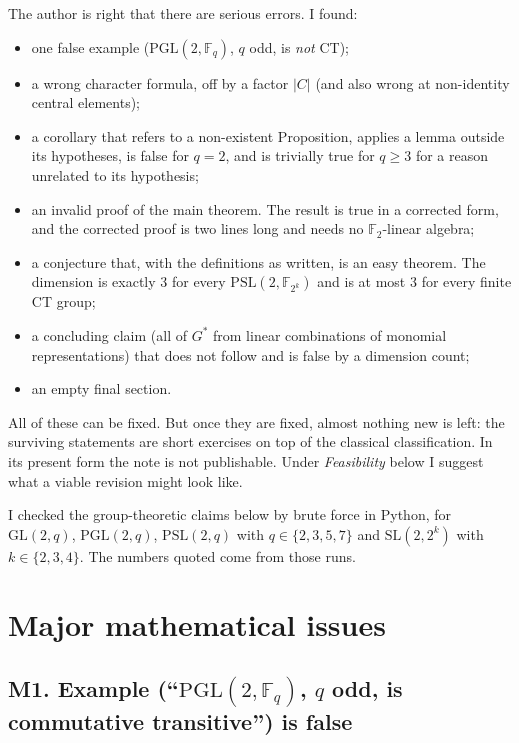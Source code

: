 \documentclass[12pt,letterpaper]{article}
\newcommand{\F}{\mathbb{F}}
\newcommand{\PGL}{\mathrm{PGL}}
\newcommand{\PSL}{\mathrm{PSL}}
\newcommand{\GL}{\mathrm{GL}}
\newcommand{\SL}{\mathrm{SL}}
\theoremstyle{definition}
\begin{document}
The author is right that there are serious errors. I found:
\begin{itemize}[leftmargin=*,itemsep=1pt]
\item one false example ($\PGL(2,\F_q)$, $q$ odd, is \emph{not} CT);
\item a wrong character formula, off by a factor $|C|$ (and also wrong at
  non-identity central elements);
\item a corollary that refers to a non-existent Proposition, applies a
  lemma outside its hypotheses, is false for $q=2$, and is trivially true
  for $q\ge3$ for a reason unrelated to its hypothesis;
\item an invalid proof of the main theorem. The result is true in a
  corrected form, and the corrected proof is two lines long and needs no
  $\F_2$-linear algebra;
\item a conjecture that, with the definitions as written, is an easy
  theorem. The dimension is exactly $3$ for every $\PSL(2,\F_{2^k})$ and
  is at most $3$ for every finite CT group;
\item a concluding claim (all of $G^*$ from linear combinations of
  monomial representations) that does not follow and is false by a
  dimension count;
\item an empty final section.
\end{itemize}
All of these can be fixed. But once they are fixed, almost nothing new
is left: the surviving statements are short exercises on top of the
classical classification. In its present form the note is not
publishable. Under \emph{Feasibility} below I suggest what a viable
revision might look like.

I checked the group-theoretic claims below by brute force in Python, for
$\GL(2,q)$, $\PGL(2,q)$, $\PSL(2,q)$ with $q\in\{2,3,5,7\}$ and
$\SL(2,2^k)$ with $k\in\{2,3,4\}$. The numbers quoted come from those
runs.

\section{Major mathematical issues}

\subsection*{M1. Example (``$\PGL(2,\F_q)$, $q$ odd, is commutative transitive'') is false}
\end{document}
